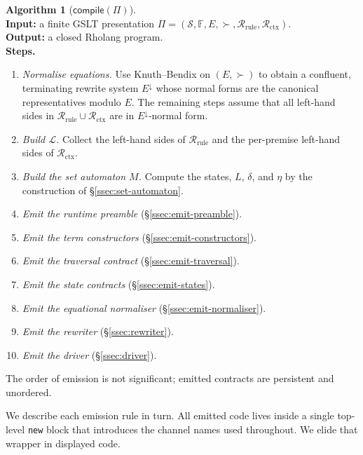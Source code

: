 \documentclass[11pt]{article}
\theoremstyle{plain}
\theoremstyle{definition}
\newtheorem{algorithm}[theorem]{Algorithm}
\theoremstyle{remark}
\newcommand{\Lhs}{\mathcal{L}}
\begin{document}
\begin{algorithm}[$\mathsf{compile}(\Pi)$]\label{alg:compile}
\hfill\\
\noindent
\textbf{Input:} a finite GSLT presentation
$\Pi = (\mathcal{S}, \mathbb{F}, E, \succ, \mathcal{R}_{\mathrm{rule}}, \mathcal{R}_{\mathrm{ctx}})$.\\
\textbf{Output:} a closed Rholang program.\\
\noindent
\textbf{Steps.}
\begin{enumerate}[leftmargin=2em]
  \item \emph{Normalise equations.} Use Knuth--Bendix on $(E, \succ)$ to
        obtain a confluent, terminating rewrite system $E^{\downarrow}$
        whose normal forms are the canonical representatives modulo $E$.
        The remaining steps assume that all left-hand sides in
        $\mathcal{R}_{\mathrm{rule}} \cup \mathcal{R}_{\mathrm{ctx}}$ are
        in $E^{\downarrow}$-normal form.
  \item \emph{Build $\Lhs$.} Collect the left-hand sides of
        $\mathcal{R}_{\mathrm{rule}}$ and the per-premise left-hand sides
        of $\mathcal{R}_{\mathrm{ctx}}$.
  \item \emph{Build the set automaton $M$.} Compute the states, $L$,
        $\delta$, and $\eta$ by the construction of
        \S\ref{ssec:set-automaton}.
  \item \emph{Emit the runtime preamble} (\S\ref{ssec:emit-preamble}).
  \item \emph{Emit the term constructors} (\S\ref{ssec:emit-constructors}).
  \item \emph{Emit the traversal contract} (\S\ref{ssec:emit-traversal}).
  \item \emph{Emit the state contracts} (\S\ref{ssec:emit-states}).
  \item \emph{Emit the equational normaliser} (\S\ref{ssec:emit-normaliser}).
  \item \emph{Emit the rewriter} (\S\ref{ssec:rewriter}).
  \item \emph{Emit the driver} (\S\ref{ssec:driver}).
\end{enumerate}
The order of emission is not significant; emitted contracts are persistent
and unordered.
\end{algorithm}

We describe each emission rule in turn. All emitted code lives inside a
single top-level \texttt{new} block that introduces the channel names used
throughout. We elide that wrapper in displayed code.
\end{document}
